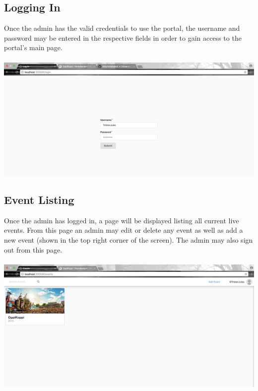 \documentclass[11pt]{article}
\begin{document}
	\subsection{Logging In}
	Once the admin has the valid credentials to use the portal, the username and password may be entered in the respective fields in order to gain access to the portal's main page.
	\\
	\\
\includegraphics[width=\linewidth]{login.png}
\pagebreak
	\subsection{Event Listing}
	Once the admin has logged in, a page will be displayed listing all current live events. From this page an admin may edit or delete any event as well as add a new event (shown in the top right corner of the screen). The admin may also sign out from this page.
	\\
	\\
	\includegraphics[width=\linewidth]{home.png}
	\pagebreak
\end{document}
